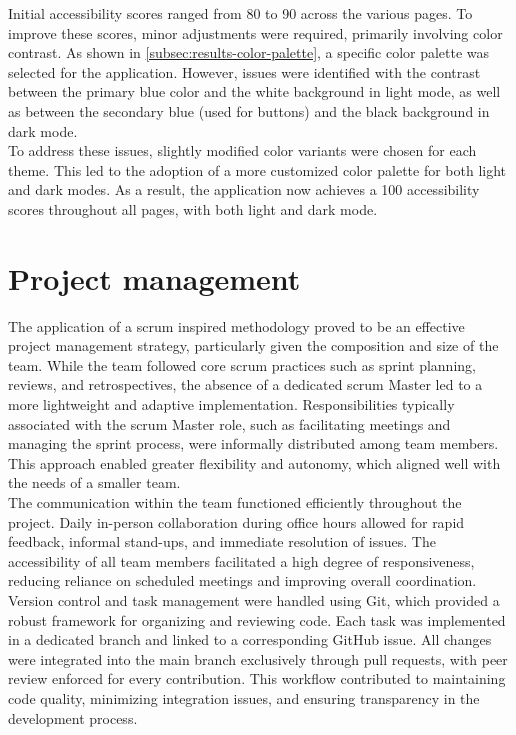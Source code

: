 Initial accessibility scores ranged from 80 to 90 across the various pages. To improve these scores, minor adjustments were required, primarily involving color contrast. As shown in \ref{subsec:results-color-palette}, a specific color palette was selected for the application. However, issues were identified with the contrast between the primary blue color and the white background in light mode, as well as between the secondary blue (used for buttons) and the black background in dark mode. \\

To address these issues, slightly modified color variants were chosen for each theme. This led to the adoption of a more customized color palette for both light and dark modes. As a result, the application now achieves a 100 accessibility scores throughout all pages, with both light and dark mode. 

\section{Project management}
\label{sec:discussion-project-management}

The application of a \gls{scrum} inspired methodology proved to be an effective project management strategy, particularly given the composition and size of the team. While the team followed core \gls{scrum} practices such as sprint planning, reviews, and retrospectives, the absence of a dedicated \gls{scrum} Master led to a more lightweight and adaptive implementation. Responsibilities typically associated with the \gls{scrum} Master role, such as facilitating meetings and managing the sprint process, were informally distributed among team members. This approach enabled greater flexibility and autonomy, which aligned well with the needs of a smaller team. \\

The communication within the team functioned efficiently throughout the project. Daily in-person collaboration during office hours allowed for rapid feedback, informal stand-ups, and immediate resolution of issues. The accessibility of all team members facilitated a high degree of responsiveness, reducing reliance on scheduled meetings and improving overall coordination.\\

Version control and task management were handled using Git, which provided a robust framework for organizing and reviewing code. Each task was implemented in a dedicated branch and linked to a corresponding GitHub issue. All changes were integrated into the main branch exclusively through pull requests, with peer review enforced for every contribution. This workflow contributed to maintaining code quality, minimizing integration issues, and ensuring transparency in the development process. \\

